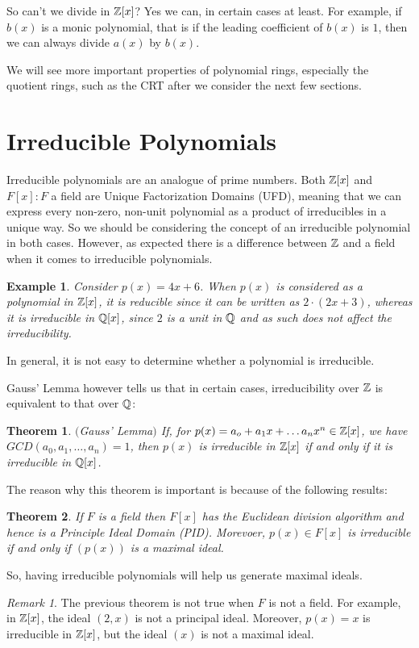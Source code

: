 \documentclass[12pt]{article}
\theoremstyle{plain}
\newtheorem{example}{Example}
\newtheorem{theorem}{Theorem}
\theoremstyle{definition}
\theoremstyle{remark}
\newtheorem{remark}{Remark}
\begin{document}
So can't we divide in $\mathbb{Z}[x]$? Yes we can, in certain cases at least. For example, if $b(x)$ is a monic polynomial, that is if the leading coefficient of $b(x)$ is $1$, then we can always divide $a(x)$ by $b(x)$.

We will see more important properties of polynomial rings, especially the quotient rings, such as the CRT after we consider the next few sections.
\section{Irreducible Polynomials} Irreducible polynomials are an analogue of prime numbers. Both $\mathbb{Z}[x]$ and $F[x]: F$ a field are Unique Factorization Domains (UFD), meaning that we can express every non-zero, non-unit polynomial as a product of irreducibles in a unique way. So we should be considering the concept of an irreducible polynomial in both cases. However, as expected there is a difference between $\mathbb{Z}$ and a field when it comes to irreducible polynomials.
\begin{example}
Consider $p(x)=4x+6$. When $p(x)$ is considered as a polynomial in $\mathbb{Z}[x]$, it is reducible since it can be written as $2\cdot (2x+3)$, whereas it is irreducible in $\mathbb{Q}[x]$, since $2$ is a unit in $\mathbb{Q}$ and as such does not affect the irreducibility.
\end{example}
In general, it is not easy to determine whether a polynomial is irreducible.

Gauss' Lemma however tells us that in certain cases, irreducibility over $\mathbb{Z}$ is equivalent to that over $\mathbb{Q}$:
\begin{theorem}$($Gauss' Lemma$)$
If, for $p(x)=a_o+a_1x+\dots a_nx^n \in \mathbb{Z}[x]$, we have
$GCD(a_0, a_1, \dots, a_n)=1$, then $p(x)$ is irreducible in $\mathbb{Z}[x]$ if and only if it is irreducible in $\mathbb{Q}[x]$.
\end{theorem}
The reason why this theorem is important is because of the following results:
\begin{theorem}\label{irmax}
If $F$ is a field then $F[x]$ has the Euclidean division algorithm and hence is a Principle Ideal Domain (PID). Morevoer, $p(x)\in F[x]$ is irreducible if and only if $(p(x))$ is a maximal ideal.
\end{theorem}
So, having irreducible polynomials will help us generate maximal ideals.
\begin{remark}
The previous theorem is not true when $F$ is not a field. For example, in $\mathbb{Z}[x]$, the ideal $(2,x)$ is not a principal ideal. Moreover, $p(x) = x$ is irreducible in $\mathbb{Z}[x]$, but the ideal $(x)$ is not a maximal ideal.
\end{remark}
\end{document}
